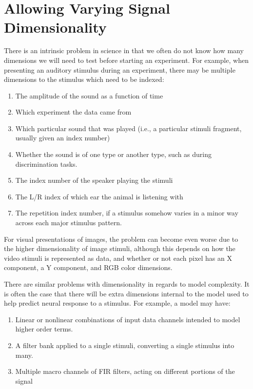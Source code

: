 \documentclass[letterpaper]{report}
\begin{document}
\section{Allowing Varying Signal Dimensionality}

There is an intrinsic problem in science in that we often do not know how many dimensions we will need to test before starting an experiment. For example, when presenting an auditory stimulus during an experiment, there may be multiple dimensions to the stimulus which need to be indexed:

\begin{enumerate}
\item The amplitude of the sound as a function of time
\item Which experiment the data came from 
\item Which particular sound that was played (i.e., a particular stimuli fragment, usually given an index number)
\item Whether the sound is of one type or another type, such as during discrimination tasks. 
\item The index number of the speaker playing the stimuli
\item The L/R index of which ear the animal is listening with
\item The repetition index number, if a stimulus somehow varies in a minor way across each major stimulus pattern.
\end{enumerate}

For visual presentations of images, the problem can become even worse due to the higher dimensionality of image stimuli, although this depends on how the video stimuli is represented as data, and whether or not each pixel has an X component, a Y component, and RGB color dimensions. 

There are similar problems with dimensionality in regards to model complexity. It is often the case that there will be extra dimensions internal to the model used to help predict neural response to a stimulus. For example, a model may have:

\begin{enumerate}
\item Linear or nonlinear combinations of input data channels intended to model higher order terms. 
\item A filter bank applied to a single stimuli, converting a single stimulus into many.
\item Multiple macro channels of FIR filters, acting on different portions of the signal 
\end{enumerate}
\end{document}
